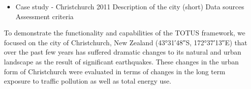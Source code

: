 \begin{itemize} 
	\item Case study - Christchurch 2011
	\subitem Description of the city (short)
	\subitem Data sources
	\subitem Assessment criteria
\end{itemize}
To demonstrate the functionality and capabilities of the TOTUS framework, we focused on the city of Christchurch, New Zealand (43°31′48″S, 172°37′13″E) that over the past few years has suffered dramatic changes to its natural and urban landscape as the result of significant earthquakes. These changes in the urban form of Christchurch were evaluated in terms of changes in the long term exposure to traffic pollution as well as total energy use.

